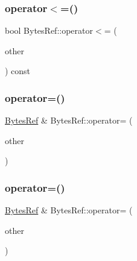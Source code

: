 \subsubsection{\texorpdfstring{operator$<$=()}{operator<=()}}
{\footnotesize\ttfamily bool Bytes\+Ref\+::operator$<$= (\begin{DoxyParamCaption}\item[{\mbox{\hyperlink{ZlibCrc32_8h_a2c212835823e3c54a8ab6d95c652660e}{const}} \mbox{\hyperlink{classlucene_1_1core_1_1util_1_1BytesRef}{Bytes\+Ref}} \&}]{other }\end{DoxyParamCaption}) const}

\mbox{\label{classlucene_1_1core_1_1util_1_1BytesRef_a83163bf442814183adc151dccf70bc73}} 
\subsubsection{\texorpdfstring{operator=()}{operator=()}\hspace{0.1cm}{\footnotesize\ttfamily [1/2]}}
{\footnotesize\ttfamily \mbox{\hyperlink{classlucene_1_1core_1_1util_1_1BytesRef}{Bytes\+Ref}} \& Bytes\+Ref\+::operator= (\begin{DoxyParamCaption}\item[{\mbox{\hyperlink{ZlibCrc32_8h_a2c212835823e3c54a8ab6d95c652660e}{const}} \mbox{\hyperlink{classlucene_1_1core_1_1util_1_1BytesRef}{Bytes\+Ref}} \&}]{other }\end{DoxyParamCaption})}

\mbox{\label{classlucene_1_1core_1_1util_1_1BytesRef_adf99f31bbffbdd8f91ef62b0e0c19337}} 
\subsubsection{\texorpdfstring{operator=()}{operator=()}\hspace{0.1cm}{\footnotesize\ttfamily [2/2]}}
{\footnotesize\ttfamily \mbox{\hyperlink{classlucene_1_1core_1_1util_1_1BytesRef}{Bytes\+Ref}} \& Bytes\+Ref\+::operator= (\begin{DoxyParamCaption}\item[{\mbox{\hyperlink{classlucene_1_1core_1_1util_1_1BytesRef}{Bytes\+Ref}} \&\&}]{other }\end{DoxyParamCaption})}

